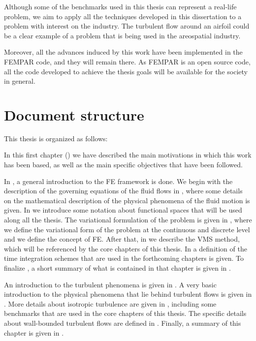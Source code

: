 \begin{itemize}
Although some of the benchmarks used in this thesis can represent a real-life problem, we aim to apply all the techniques developed in this dissertation to a problem with interest on the industry. The turbulent flow around an airfoil could be a clear example of a problem that is being used in the areospatial industry.

Moreover, all the advances induced by this work have been implemented in the FEMPAR code, and they will remain there. As FEMPAR is an open source code, all the code developed to achieve the thesis goals will be available for the society in general.


\end{itemize}

\section{Document structure}

This thesis is organized as follows:

In this first chapter () we have described the main motivations in which this work has been based, as well as the main specific objectives that have been followed.

In , a general introduction to the FE framework is done. We begin with the description of the governing equations of the fluid flows in , where some details on the mathematical description of the physical phenomena of the fluid motion is given. In  we introduce some notation about functional spaces that will be used along all the thesis. The variational formulation of the problem is given in , where we define the variational form of the problem at the continuous and discrete level and we define the concept of FE. After that, in  we describe the VMS method, which will be referenced by the core chapters of this thesis. In  a definition of the time integration schemes that are used in the forthcoming chapters is given. To finalize , a short summary of what is contained in that chapter is given in .

An introduction to the turbulent phenomena is given in . A very basic introduction to the physical phenomena that lie behind turbulent flows is given in . More details about isotropic turbulence are given in , including some benchmarks that are used in the core chapters of this thesis. The specific details about wall-bounded turbulent flows are defined in . Finally, a summary of this chapter is given in .


